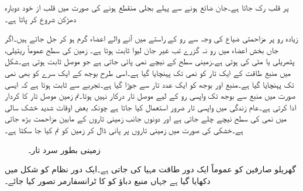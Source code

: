  پر قلب رک جاتا ہے۔جان ضائع ہونے سے پہلے بجلی منقطع ہونے کی صورت میں قلب از خود دوبارہ دھڑکن شروع کر پاتا ہے۔

زیادہ رو  پر مزاحمتی ضیاع کی وجہ سے  رو کے راستے میں آنے والے اعضاء گرم ہو کر جل جاتے ہیں۔اگر جاں بخش اعضاء میں رو نہ گزرے تب غیر جان لیوا ثابت ہوتا ہے۔  
زمین کی سطح عموماً ریتیلی، پٹھریلی یا مٹی کی ہوتی ہے۔زمینی سطح کے نیچے نمی پائی جاتی ہے جو موصل ثابت ہوتی ہے۔شکل  میں منبع طاقت کے ایک تار کو نمی تک پہنچایا گیا ہے۔اسی طرح بوجھ کے ایک سرے کو بھی نمی تک پہنچایا گیا ہے۔منبع اور بوجھ کو ایک عدد تار سے جوڑا گیا ہے۔تجربے سے ثابت ہوتا ہے کہ ایسی صورت میں منبع سے بوجھ تک واپسی رو کے لیے موصل تار درکار نہیں ہوتا۔نم زمین موصل تار کا کردار ادا کرتی ہے۔عام زندگی میں واپسی تار ضرور استعمال کیا جاتا ہے چونکہ بعض اوقات شدید خشک سالی میں نمی کی سطح نیچے چلے جاتی ہے اور دونوں جانب زمینی تاروں کے مابین مزاحمت بڑھ جاتی ہے۔خشکی کی صورت میں زمینی تاروں پر پانی ڈال کر زمین کو نم کیا جا سکتا ہے۔
\begin{figure}
\centering
{}
\caption{زمینی بطور سرد تار۔}
\label{شکل_طاقت_زمین_سرد_تار}
\end{figure}
 
گھریلو صارفین کو عموماً ایک دور طاقت مہیا کی جاتی ہے۔ایک دور نظام کو شکل  میں دکھایا گیا ہے جہاں منبع دباؤ کو  کا ٹرانسفارمر تصور کیا جائے۔

